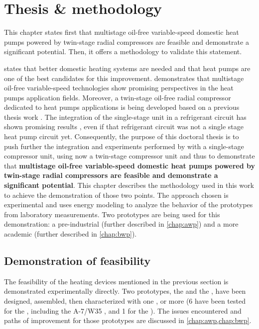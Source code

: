 \chapter{Thesis \& methodology}
\label{chap:methodo}
\resetallacronyms

\begin{shaded}
  This chapter states first that multistage oil-free variable-speed
  domestic heat pumps powered by twin-stage radial compressors are
  feasible and demonstrate a significant potential. Then, it offers a
  methodology to validate this statement.
\end{shaded}

 states that better domestic heating systems are
needed and that heat pumps are one of the best candidates for this
improvement.  demonstrates that multistage oil-free
variable-speed technologies show promising perspectives in the heat
pumps application fields. Moreover, a twin-stage oil-free radial
compressor dedicated to heat pumps applications is being developed
based on a previous thesis work \citep{schiffmann-2008a}. The
integration of the single-stage unit in a refrigerant circuit has
shown promising results \citep[p.\,221]{schiffmann-2008a}, even if
that refrigerant circuit was not a single stage heat pump circuit
yet. Consequently, the purpose of this doctoral thesis is to push
further the integration and experiments performed by
\citet{schiffmann-2008a} with a single-stage compressor unit, using
now a twin-stage compressor unit and thus to demonstrate that
\textbf{multistage oil-free variable-speed domestic heat pumps powered
  by twin-stage radial compressors are feasible and demonstrate a
  significant potential}. This chapter describes the methodology used
in this work to achieve the demonstration of those two points. The
approach chosen is experimental and uses energy modeling to analyze
the behavior of the prototypes from laboratory measurements. Two
prototypes are being used for this demonstration: a pre-industrial
\AWP{} (further described in \cref{chap:awp}) and a more academic
\BWP{} (further described in \cref{chap:bwp}).

\section{Demonstration of feasibility}
\label{sec:feasability-demo}

The feasibility of the heating devices mentioned in the previous
section is demonstrated experimentally directly. Two prototypes, the
\AWP{} and the \BWP{}, have been designed, assembled, then
characterized with one \OP{}, or more (6 \OP{} have been tested for
the \AWP{}, including the A-7/W35 \OP{}, and 1 \OP{} for the
\BWP{}). The issues encountered and paths of improvement for those
prototypes are discussed in \cref{chap:awp,chap:bwp}.

